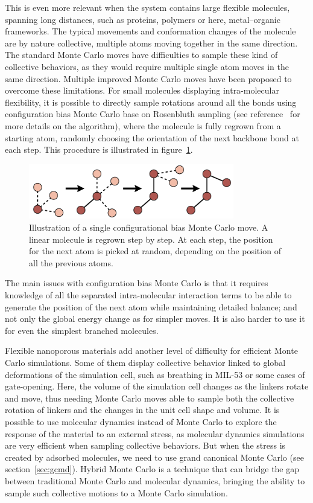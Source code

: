 \documentclass[thesis]{subfiles}
\begin{document}
This is even more relevant when the system contains large flexible molecules,
spanning long distances, such as proteins, polymers or here, metal--organic
frameworks. The typical movements and conformation changes of the molecule are
by nature collective, multiple atoms moving together in the same direction. The
standard Monte Carlo moves have difficulties to sample these kind of collective
behaviors, as they would require multiple single atom moves in the same
direction. Multiple improved Monte Carlo moves have been proposed to overcome
these limitations. For small molecules displaying intra-molecular flexibility,
it is possible to directly sample rotations around all the bonds using
configuration bias Monte Carlo base on Rosenbluth sampling (see
reference~\cite{Frenkel1997} for more details on the algorithm), where the
molecule is fully regrown from a starting atom, randomly choosing the
orientation of the next backbone bond at each step.  This procedure is
illustrated in figure~\ref{fig:cbmc}.

\begin{figure}[ht]
    \centering
    \includegraphics[width=0.8\textwidth]{figures/images/cbmc}
    \caption{Illustration of a single configurational bias Monte Carlo move. A
    linear molecule is regrown step by step. At each step, the position for the
    next atom is picked at random, depending on the position of all the
    previous atoms.}
    \label{fig:cbmc}
\end{figure}

The main issues with configuration bias Monte Carlo is that it requires
knowledge of all the separated intra-molecular interaction terms to be able to
generate the position of the next atom while maintaining detailed balance; and
not only the global energy change as for simpler moves. It is also harder to use
it for even the simplest branched molecules.

Flexible nanoporous materials add another level of difficulty for efficient
Monte Carlo simulations. Some of them display collective behavior linked to
global deformations of the simulation cell, such as breathing in MIL-53 or some
cases of gate-opening. Here, the volume of the simulation cell changes as the
linkers rotate and move, thus needing Monte Carlo moves able to sample both the
collective rotation of linkers and the changes in the unit cell shape and
volume. It is possible to use molecular dynamics instead of Monte Carlo to
explore the response of the material to an external stress, as molecular
dynamics simulations are very efficient when sampling collective behaviors. But
when the stress is created by adsorbed molecules, we need to use grand canonical
Monte Carlo (see section~\ref{sec:gcmd}). Hybrid Monte Carlo is a technique that
can bridge the gap between traditional Monte Carlo and molecular dynamics,
bringing the ability to sample such collective motions to a Monte Carlo
simulation\cite{Rogge2019}.
\end{document}
